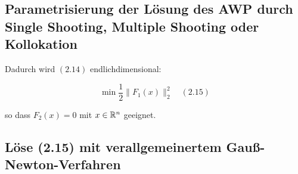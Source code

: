 
\subsection*{Parametrisierung der Lösung des AWP durch Single Shooting, Multiple Shooting oder Kollokation}

Dadurch wird $(2.14)$ endlichdimensional:

\[ \min \frac 12 \|F_1(x)\|_2^2 \quad (2.15)\]

so dass $F_2(x) = 0$ mit $x \in \mathbb{R}^n$ geeignet.

\subsection*{Löse (2.15) mit verallgemeinertem Gauß-Newton-Verfahren}
